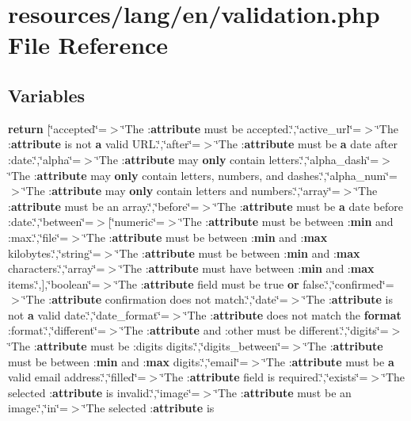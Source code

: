 \section{resources/lang/en/validation.php File Reference}
\label{validation_8php}
\subsection*{Variables}
\begin{DoxyCompactItemize}
\item 
{\bf return} [\char`\"{}accepted\char`\"{}=$>$\char`\"{}The \+:{\bf attribute} must be accepted.\char`\"{},\char`\"{}active\+\_\+url\char`\"{}=$>$\char`\"{}The \+:{\bf attribute} is not {\bf a} valid U\+R\+L.\char`\"{},\char`\"{}after\char`\"{}=$>$\char`\"{}The \+:{\bf attribute} must be {\bf a} date after \+:date.\char`\"{},\char`\"{}alpha\char`\"{}=$>$\char`\"{}The \+:{\bf attribute} may {\bf only} contain letters.\char`\"{},\char`\"{}alpha\+\_\+dash\char`\"{}=$>$\char`\"{}The \+:{\bf attribute} may {\bf only} contain letters, numbers, and dashes.\char`\"{},\char`\"{}alpha\+\_\+num\char`\"{}=$>$\char`\"{}The \+:{\bf attribute} may {\bf only} contain letters and numbers.\char`\"{},\char`\"{}array\char`\"{}=$>$\char`\"{}The \+:{\bf attribute} must be an array.\char`\"{},\char`\"{}before\char`\"{}=$>$\char`\"{}The \+:{\bf attribute} must be {\bf a} date before \+:date.\char`\"{},\char`\"{}between\char`\"{}=$>$[\char`\"{}numeric\char`\"{}=$>$\char`\"{}The \+:{\bf attribute} must be between \+:{\bf min} and \+:max.\char`\"{},\char`\"{}file\char`\"{}=$>$\char`\"{}The \+:{\bf attribute} must be between \+:{\bf min} and \+:{\bf max} kilobytes.\char`\"{},\char`\"{}string\char`\"{}=$>$\char`\"{}The \+:{\bf attribute} must be between \+:{\bf min} and \+:{\bf max} characters.\char`\"{},\char`\"{}array\char`\"{}=$>$\char`\"{}The \+:{\bf attribute} must have between \+:{\bf min} and \+:{\bf max} items.\char`\"{},],\char`\"{}boolean\char`\"{}=$>$\char`\"{}The \+:{\bf attribute} field must be true {\bf or} false.\char`\"{},\char`\"{}confirmed\char`\"{}=$>$\char`\"{}The \+:{\bf attribute} confirmation does not match.\char`\"{},\char`\"{}date\char`\"{}=$>$\char`\"{}The \+:{\bf attribute} is not {\bf a} valid date.\char`\"{},\char`\"{}date\+\_\+format\char`\"{}=$>$\char`\"{}The \+:{\bf attribute} does not match the {\bf format} \+:format.\char`\"{},\char`\"{}different\char`\"{}=$>$\char`\"{}The \+:{\bf attribute} and \+:other must be different.\char`\"{},\char`\"{}digits\char`\"{}=$>$\char`\"{}The \+:{\bf attribute} must be \+:digits digits.\char`\"{},\char`\"{}digits\+\_\+between\char`\"{}=$>$\char`\"{}The \+:{\bf attribute} must be between \+:{\bf min} and \+:{\bf max} digits.\char`\"{},\char`\"{}email\char`\"{}=$>$\char`\"{}The \+:{\bf attribute} must be {\bf a} valid email address.\char`\"{},\char`\"{}filled\char`\"{}=$>$\char`\"{}The \+:{\bf attribute} field is required.\char`\"{},\char`\"{}exists\char`\"{}=$>$\char`\"{}The selected \+:{\bf attribute} is invalid.\char`\"{},\char`\"{}image\char`\"{}=$>$\char`\"{}The \+:{\bf attribute} must be an image.\char`\"{},\char`\"{}in\char`\"{}=$>$\char`\"{}The selected \+:{\bf attribute} is 
\end{DoxyCompactItemize}
